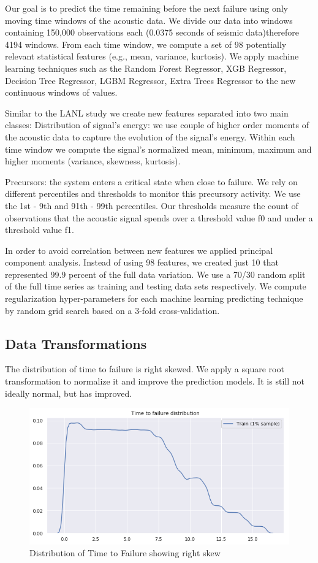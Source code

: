 \documentclass[]{llncs}
\begin{document}
Our goal is to predict the time remaining before the next failure using only moving time windows of the acoustic data. We divide our data into windows containing 150,000 observations each (0.0375 seconds of seismic data)therefore 4194 windows. From each time window, we compute a set of 98 potentially relevant statistical features (e.g., mean, variance, kurtosis). 
We apply machine learning techniques such as the Random Forest Regressor, XGB Regressor,  Decision Tree Regressor, LGBM Regressor, Extra Trees Regressor to the new continuous windows of values.\par
Similar to the LANL study we create new features separated into two main classes: 
Distribution of signal’s energy: we use couple of higher order moments of the acoustic data to capture the evolution of the signal’s energy. Within each time window we compute the signal’s normalized mean, minimum, maximum and higher moments  (variance, skewness, kurtosis).\par
Precursors: the system enters a critical state when close to failure. We rely on different percentiles and thresholds to monitor this precursory activity. We use the 1st - 9th and 91th - 99th percentiles. Our thresholds measure the count of observations that the acoustic signal spends over a threshold value f0 and under a threshold value f1.

In order to avoid correlation between new features we applied principal component analysis.  Instead of using 98 features, we created just 10 that represented 99.9 percent of the full data variation.
We use a 70/30 random split of the full time series as training and testing data sets respectively. We compute regularization hyper-parameters for each machine learning predicting technique by random grid search based on a 3-fold cross-validation.
\subsection{Data Transformations}
The distribution of time to failure is right skewed. We apply a square root transformation to normalize it and improve the prediction models. It is still not ideally normal, but has improved.
\begin{figure}
	\centering
	\includegraphics[width=1\linewidth]{../GPUProject/transform1}
	\caption{Distribution of Time to Failure showing right skew}
	\label{fig:morethan90percent}
\end{figure}
\end{document}

